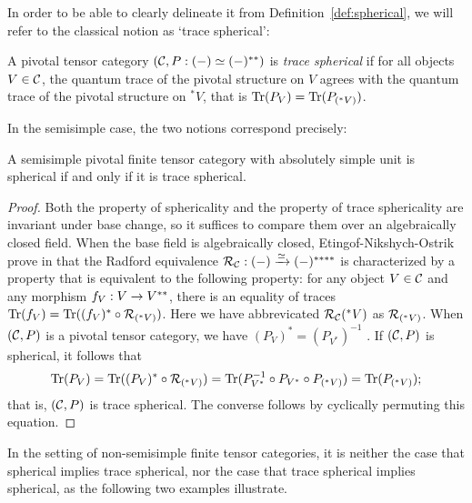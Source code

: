 \documentclass{amsart}
\begin{document}
In order to be able to clearly delineate it from Definition~\ref{def:spherical}, we will refer to the classical notion as `trace spherical':
\begin{definition} \label{def:trspherical}
A pivotal tensor category $(\mathcal C, P: (-) \simeq (-)^{**})$ is \emph{trace spherical} if for all objects $V \in \mathcal C$, the quantum trace of the pivotal structure on $V$ agrees with the quantum trace of the pivotal structure on ${}^* V$, that is $\mathrm{Tr}(P_V) = \mathrm{Tr}(P_{({}^* V)})$.
\end{definition} %
\nid In the semisimple case, the two notions correspond precisely:
\begin{proposition}
A semisimple pivotal finite tensor category with absolutely simple unit is spherical if and only if it is trace spherical.
\end{proposition} %
\begin{proof}
Both the property of sphericality and the property of trace sphericality are invariant under base change, so it suffices to compare them over an algebraically closed field.  When the base field is algebraically closed, Etingof-Nikshych-Ostrik prove in \cite[Thm 7.3 and Cor 7.4]{MR2097289} that the Radford equivalence $\mathcal R_\mathcal C : (-) \xrightarrow{\simeq} (-)^{****}$ is characterized by a property that is equivalent to the following property: for any object $V \in \mathcal C$ and any morphism $f_V: V \rightarrow V^{**}$, there is an equality of traces $\mathrm{Tr}(f_V) = \mathrm{Tr}((f_V)^* \circ \mathcal R_{({}^* V)})$.  Here we have abbrevicated $\mathcal R_\mathcal C({}^* V)$ as $\mathcal R_{({}^* V)}$.  When $(\mathcal C,P)$ is a pivotal tensor category, we have $(P_V)^* = (P_{V^*})^{-1}$ \cite[Lemma 4.11]{0908.3347}. %
If $(\mathcal C,P)$ is spherical, it follows that
\[
\Tr(P_V) = \Tr((P_V)^* \circ \cR_{({}^* V)}) %
= \Tr(P_{V^*}^{-1} \circ P_{V^*} \circ P_{({}^* V)}) = \Tr(P_{({}^* V)});
\]
that is, $(\mathcal C,P)$ is trace spherical.  The converse follows by cyclically permuting this equation.
\end{proof}

In the setting of non-semisimple finite tensor categories, it is neither the case that spherical implies trace spherical, nor the case that trace spherical implies spherical, as the following two examples illustrate.
\end{document}
